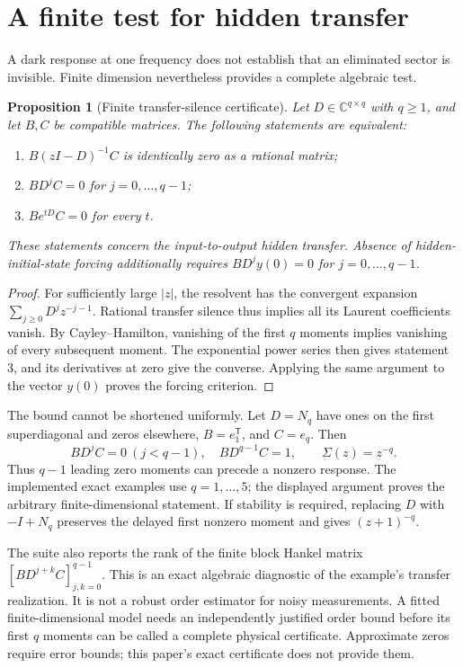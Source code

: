 \documentclass[11pt]{article}
\newtheorem{proposition}{Proposition}
\newcommand{\C}{\mathbb C}
\begin{document}
\section{A finite test for hidden transfer}
A dark response at one frequency does not establish that an eliminated sector is invisible. Finite dimension nevertheless provides a complete algebraic test.

\begin{proposition}[Finite transfer-silence certificate]
Let $D\in\C^{q\times q}$ with $q\geq1$, and let $B,C$ be compatible matrices. The following statements are equivalent:
\begin{enumerate}[nosep]
\item $B(zI-D)^{-1}C$ is identically zero as a rational matrix;
\item $BD^jC=0$ for $j=0,\ldots,q-1$;
\item $Be^{tD}C=0$ for every $t$.
\end{enumerate}
These statements concern the input-to-output hidden transfer. Absence of hidden-initial-state forcing additionally requires $BD^jy(0)=0$ for $j=0,\ldots,q-1$.
\end{proposition}
\begin{proof}
For sufficiently large $|z|$, the resolvent has the convergent expansion $\sum_{j\geq0}D^jz^{-j-1}$. Rational transfer silence thus implies all its Laurent coefficients vanish. By Cayley--Hamilton, vanishing of the first $q$ moments implies vanishing of every subsequent moment. The exponential power series then gives statement 3, and its derivatives at zero give the converse. Applying the same argument to the vector $y(0)$ proves the forcing criterion.
\end{proof}

The bound cannot be shortened uniformly. Let $D=N_q$ have ones on the first superdiagonal and zeros elsewhere, $B=e_1^{\mathsf T}$, and $C=e_q$. Then
\begin{equation}
BD^jC=0\ (j<q-1),\quad BD^{q-1}C=1,\qquad
\Sigma(z)=z^{-q}.
\end{equation}
Thus $q-1$ leading zero moments can precede a nonzero response. The implemented exact examples use $q=1,\ldots,5$; the displayed argument proves the arbitrary finite-dimensional statement. If stability is required, replacing $D$ with $-I+N_q$ preserves the delayed first nonzero moment and gives $(z+1)^{-q}$.

The suite also reports the rank of the finite block Hankel matrix $[BD^{j+k}C]_{j,k=0}^{q-1}$. This is an exact algebraic diagnostic of the example's transfer realization. It is not a robust order estimator for noisy measurements. A fitted finite-dimensional model needs an independently justified order bound before its first $q$ moments can be called a complete physical certificate. Approximate zeros require error bounds; this paper's exact certificate does not provide them.
\end{document}
